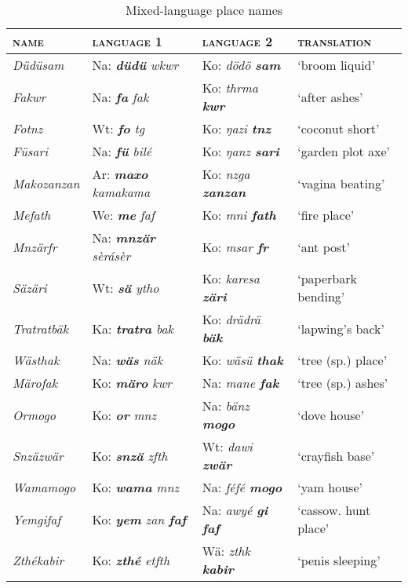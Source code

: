 \begin{table}
\caption{Mixed-language place names}
\label{tab:mixedtoponyms}
	\begin{tabularx}{\textwidth}{llll}
	\lsptoprule
		\textsc{name}&\textsc{language 1}&\textsc{language 2}&\textsc{translation}\\
		\midrule 
        \textit{Düdüsam}&Na: \textit{\textbf{düdü} wkwr}&Ko: \textit{dödö \textbf{sam}}&‘broom liquid’\\
        \textit{Fakwr}&Na: \textit{\textbf{fa} fak}&Ko: \textit{thrma \textbf{kwr}}&‘after ashes’\\
        \textit{Fotnz}&Wt: \textit{\textbf{fo} tg}&Ko: \textit{ŋazi \textbf{tnz}}&‘coconut short’\\
        \textit{Füsari}&Na: \textit{\textbf{fü} bilé}&Ko: \textit{ŋanz \textbf{sari}}&‘garden plot axe’\\
        \textit{Makozanzan}&Ar: \textit{\textbf{maxo} kamakama}&Ko: \textit{nzga \textbf{zanzan}}&‘vagina beating’\\        
        \textit{Mefath}&We: \textit{\textbf{me} faf}&Ko: \textit{mni \textbf{fath}}&‘fire place’\\
        \textit{Mnzärfr}&Na: \textit{\textbf{mnzär} sèrásèr}&Ko: \textit{msar \textbf{fr}}&‘ant post’\\
		\textit{Säzäri}&Wt: \textit{\textbf{sä} ytho}&Ko: \textit{karesa \textbf{zäri}}&‘paperbark bending’\\
        \textit{Tratratbäk}&Ka: \textit{\textbf{tratra} bak}&Ko: \textit{drädrä \textbf{bäk}}&‘lapwing's back’\\        
        \textit{Wästhak}&Na: \textit{\textbf{wäs} näk}&Ko: \textit{wäsü \textbf{thak}}&‘tree (sp.) place’\\
        \midrule
        \textit{Märofak}&Ko: \textit{\textbf{märo} kwr}&Na: \textit{mane \textbf{fak}}&‘tree (sp.) ashes’\\
        \textit{Ormogo}&Ko: \textit{\textbf{or} mnz}&Na: \textit{bänz \textbf{mogo}}&‘dove house’\\        
        \textit{Snzäzwär}&Ko: \textit{\textbf{snzä} zfth}&Wt: \textit{dawi \textbf{zwär}}&‘crayfish base’\\
        \textit{Wamamogo}&Ko: \textit{\textbf{wama} mnz}&Na: \textit{féfé \textbf{mogo}}&‘yam house’\\
        \textit{Yemgifaf}&Ko: \textit{\textbf{yem} zan \textbf{faf}}&Na: \textit{awyé \textbf{gi} \textbf{faf}}&‘cassow. hunt place’\\
        \textit{Zthékabir}&Ko: \textit{\textbf{zthé} etfth}&Wä: \textit{zthk \textbf{kabir}}&‘penis sleeping’\\

\end{tabularx}
\end{table}

